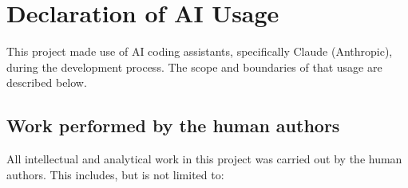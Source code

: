 
\section*{Declaration of AI Usage}

This project made use of AI coding assistants, specifically Claude (Anthropic),
during the development process.
The scope and boundaries of that usage are described below.

\subsection*{Work performed by the human authors}

All intellectual and analytical work in this project was carried out by the
human authors.
This includes, but is not limited to:

